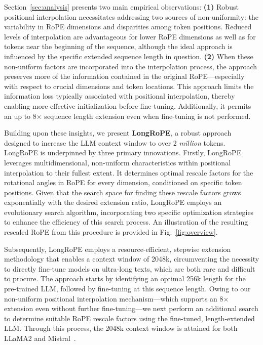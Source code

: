 Section~\ref{sec:analysis} presents two main empirical observations: \textbf{(1)} Robust positional interpolation necessitates addressing two sources of non-uniformity: the variability in RoPE dimensions and disparities among token positions. Reduced levels of interpolation are advantageous for lower RoPE dimensions as well as for tokens near the beginning of the sequence, although the ideal approach is influenced by the specific extended sequence length in question.
\textbf{(2)} When these non-uniform factors are incorporated into the interpolation process, the approach preserves more of the information contained in the original RoPE—especially with respect to crucial dimensions and token locations. This approach limits the information loss typically associated with positional interpolation, thereby enabling more effective initialization before fine-tuning. Additionally, it permits an up to 8$\times$ sequence length extension even when fine-tuning is not performed.

Building upon these insights, we present \textbf{LongRoPE}, a robust approach designed to increase the LLM context window to over 2 \emph{million} tokens. LongRoPE is underpinned by three primary innovations. Firstly, {LongRoPE} leverages multidimensional, non-uniform characteristics within positional interpolation to their fullest extent. It determines optimal rescale factors for the rotational angles in RoPE for every dimension, conditioned on specific token positions. Given that the search space for finding these rescale factors grows exponentially with the desired extension ratio, {LongRoPE} employs an evolutionary search algorithm, incorporating two specific optimization strategies to enhance the efficiency of this search process. An illustration of the resulting rescaled RoPE from this procedure is provided in Fig.~\ref{fig:overview}.

Subsequently, {LongRoPE} employs a resource-efficient, stepwise extension methodology that enables a context window of 2048k, circumventing the necessity to directly fine-tune models on ultra-long texts, which are both rare and difficult to procure. The approach starts by identifying an optimal 256k length for the pre-trained LLM, followed by fine-tuning at this sequence length. Owing to our non-uniform positional interpolation mechanism—which supports an 8$\times$ extension even without further fine-tuning—we next perform an additional search to determine suitable RoPE rescale factors using the fine-tuned, length-extended LLM. Through this process, the 2048k context window is attained for both LLaMA2 and Mistral~\cite{mistral}.

